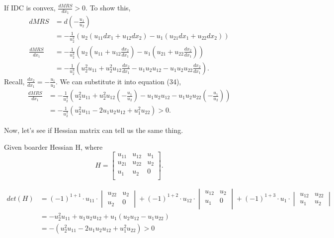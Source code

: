 \documentclass[12pt]{article}
\begin{document}
If IDC is convex, $ \frac{dMRS}{dx_1} > 0 $. To show this,
\begin{align}
				dMRS &= d(-\frac{u_1}{u_2})\\
						 &= -\frac{1}{u_2^{2}}(u_2(u_{11}dx_1 + u_{12}dx_2) - 
						 u_1(u_{21}dx_1 + u_{22}dx_2))\\
				\frac{dMRS}{dx_1} &= -\frac{1}{u_2^{2}}\left( 
				u_2(u_{11} + u_{12}\frac{dx_2}{dx_1}) - u_1(u_{21} + u_{22}\frac{dx_2}{
				dx_1})\right) \\
				 &= -\frac{1}{u_2^{3}}\left( 
				 u_2^{2}u_{11} + u_2^{2}u_{12}\frac{dx_2}{dx_1} - u_1u_2u_{12}
				 - u_1u_2u_{22}\frac{dx_2}{dx_1}\right) .
\end{align}
Recall, $ \frac{dx_2}{dx_1} = -\frac{u_1}{u_2} $. We can substitute it into
equation (34),
\begin{align}
				\frac{dMRS}{dx_1} &= 
				-\frac{1}{u_2^{3}}\left( u_2^{2}u_{11} + u_2^{2}u_{12}(-\frac{u_1}{u_2})
				 - u_1u_2u_{12} - u_1u_2u_{22}(-\frac{u_1}{u_2})\right) \\
				 &= -\frac{1}{u_2^{3}}(u_2^{2}u_{11} - 2u_1u_2u_{12} + u_1^{2}u_{22})
				 >0.
\end{align}


Now, let's see if Hessian matrix can tell us the same thing.

Given boarder Hessian H, where
\begin{equation}
				H = 
				\begin{bmatrix}
				u_{11} &u_{12} &u_1 \\
				u_{21} &u_{22} &u_2 \\
				u_{1} &u_{2} &0 \\
				\end{bmatrix}.
\end{equation}


\begin{align}
				det(H) &= (-1)^{1 + 1}\cdot u_{11}\cdot 
				\begin{vmatrix}
								u_{22} & u_2\\
								u_2    &0
				\end{vmatrix}
				 + (-1)^{1 + 2}\cdot u_{12}\cdot 
				\begin{vmatrix}
				u_{12} &u_2\\
				u_1 &0\\
				\end{vmatrix}
				 + (-1)^{1 + 3}\cdot u_1\cdot 
				 \begin{vmatrix}
								 u_{12} &u_{22}\\
								 u_1 & u_2
				 \end{vmatrix}\\
							 &= -u_2^{2}u_{11} + u_1u_2u_{12} + u_1(u_2u_{12} - u_1u_{22})\\
							 &= -(u_2^{2}u_{11} - 2u_1u_2u_{12} + u_1^{2}u_{22}) > 0
\end{align}
\end{document}
